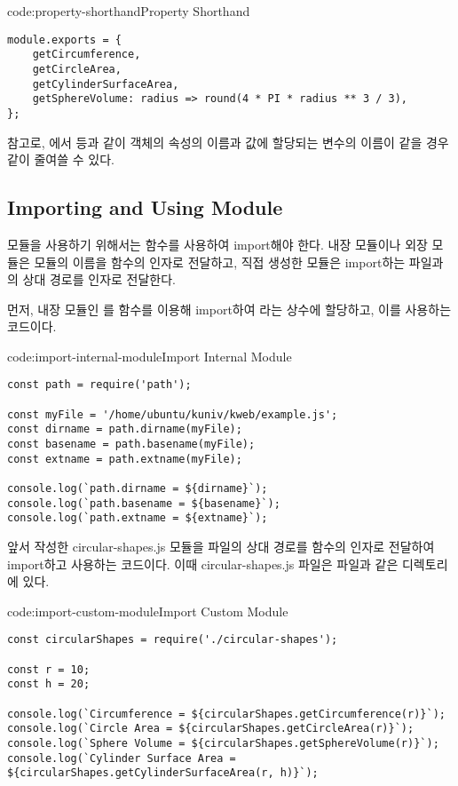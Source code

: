 \begin{codeenv}{code:property-shorthand}{Property Shorthand}\begin{verbatim}
module.exports = {
    getCircumference,
    getCircleArea,
    getCylinderSurfaceArea,
    getSphereVolume: radius => round(4 * PI * radius ** 3 / 3),
};
\end{verbatim}
\end{codeenv}

참고로, 에서  등과 같이 객체의 속성의 이름과 값에 할당되는 변수의 이름이 같을 경우 \와 같이 줄여쓸 수 있다.
\clearpage

\subsection*{Importing and Using Module}

모듈을 사용하기 위해서는  함수를 사용하여 import해야 한다. 내장 모듈이나 외장 모듈은 모듈의 이름을  함수의 인자로 전달하고, 직접 생성한 모듈은 import하는 파일과의 상대 경로를 인자로 전달한다.

먼저, \은 내장 모듈인 를  함수를 이용해 import하여 라는 상수에 할당하고, 이를 사용하는 코드이다.

\begin{codeenv}{code:import-internal-module}{Import Internal Module}\begin{verbatim}
const path = require('path');

const myFile = '/home/ubuntu/kuniv/kweb/example.js';
const dirname = path.dirname(myFile);
const basename = path.basename(myFile);
const extname = path.extname(myFile);

console.log(`path.dirname = ${dirname}`);
console.log(`path.basename = ${basename}`);
console.log(`path.extname = ${extname}`);
\end{verbatim}
\end{codeenv}

\은 앞서 작성한 circular-shapes.js 모듈을 파일의 상대 경로를  함수의 인자로 전달하여 import하고 사용하는 코드이다. 이때 circular-shapes.js 파일은  파일과 같은 디렉토리에 있다.

\begin{codeenv}{code:import-custom-module}{Import Custom Module }\begin{verbatim}
const circularShapes = require('./circular-shapes');

const r = 10;
const h = 20;

console.log(`Circumference = ${circularShapes.getCircumference(r)}`);
console.log(`Circle Area = ${circularShapes.getCircleArea(r)}`);
console.log(`Sphere Volume = ${circularShapes.getSphereVolume(r)}`);
console.log(`Cylinder Surface Area = ${circularShapes.getCylinderSurfaceArea(r, h)}`);
\end{verbatim}
\end{codeenv}

